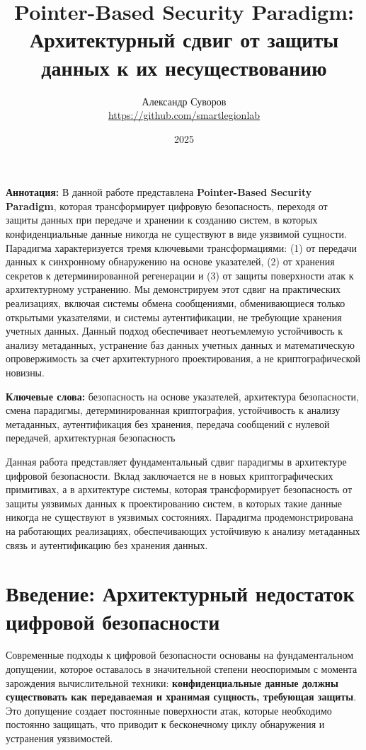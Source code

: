 \documentclass[11pt,a4paper]{article}
\title{Pointer-Based Security Paradigm: Архитектурный сдвиг от защиты данных к их несуществованию}
\author{Александр Суворов \\ \url{https://github.com/smartlegionlab}}
\date{2025}
\begin{document}
\maketitle

\begin{summarybox}
\textbf{Аннотация:} В данной работе представлена \textbf{Pointer-Based Security Paradigm}, которая трансформирует цифровую безопасность, переходя от защиты данных при передаче и хранении к созданию систем, в которых конфиденциальные данные никогда не существуют в виде уязвимой сущности. Парадигма характеризуется тремя ключевыми трансформациями: (1) от передачи данных к синхронному обнаружению на основе указателей, (2) от хранения секретов к детерминированной регенерации и (3) от защиты поверхности атак к архитектурному устранению. Мы демонстрируем этот сдвиг на практических реализациях, включая системы обмена сообщениями, обменивающиеся только открытыми указателями, и системы аутентификации, не требующие хранения учетных данных. Данный подход обеспечивает неотъемлемую устойчивость к анализу метаданных, устранение баз данных учетных данных и математическую опровержимость за счет архитектурного проектирования, а не криптографической новизны.
\end{summarybox}

\textbf{Ключевые слова:} безопасность на основе указателей, архитектура безопасности, смена парадигмы, детерминированная криптография, устойчивость к анализу метаданных, аутентификация без хранения, передача сообщений с нулевой передачей, архитектурная безопасность

\begin{importantbox}
Данная работа представляет фундаментальный сдвиг парадигмы в архитектуре цифровой безопасности. Вклад заключается не в новых криптографических примитивах, а в архитектуре системы, которая трансформирует безопасность от защиты уязвимых данных к проектированию систем, в которых такие данные никогда не существуют в уязвимых состояниях. Парадигма продемонстрирована на работающих реализациях, обеспечивающих устойчивую к анализу метаданных связь и аутентификацию без хранения данных.
\end{importantbox}

\section{Введение: Архитектурный недостаток цифровой безопасности}

Современные подходы к цифровой безопасности основаны на фундаментальном допущении, которое оставалось в значительной степени неоспоримым с момента зарождения вычислительной техники: \textbf{конфиденциальные данные должны существовать как передаваемая и хранимая сущность, требующая защиты}. Это допущение создает постоянные поверхности атак, которые необходимо постоянно защищать, что приводит к бесконечному циклу обнаружения и устранения уязвимостей.
\end{document}
